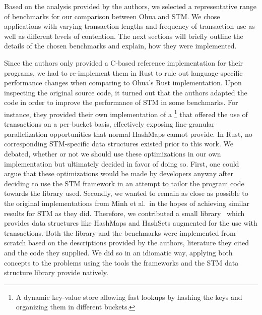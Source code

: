 Based on the analysis provided by the authors, we selected a representative range of benchmarks for our comparison between Ohua and STM.
We chose applications with varying transaction lengths and frequency of transaction use as well as different levels of contention.
The next sections will briefly outline the details of the chosen benchmarks and explain, how they were implemented.


Since the authors only provided a C-based reference implementation for their programs, we had to re-implement them in Rust to rule out language-specific performance changes when comparing to Ohua's Rust implementation.
Upon inspecting the original source code, it turned out that the authors adapted the code in order to improve the performance of STM in some benchmarks.
For instance, they provided their own implementation of a \footnote{A dynamic key-value store allowing fast lookups by hashing the keys and organizing them in different buckets.} that offered the use of transactions on a per-bucket basis, effectively exposing fine-granular parallelization opportunities that normal HashMaps cannot provide.
In Rust, no corresponding STM-specific data structures existed prior to this work.
We debated, whether or not we should use these optimizations in our own implementation but ultimately decided in favor of doing so.
First, one could argue that these optimizations would be made by developers anyway after deciding to use the STM framework in an attempt to tailor the program code towards the library used.
Secondly, we wanted to remain as close as possible to the original implementations from Minh et al.\ in the hopes of achieving similar results for STM as they did.
Therefore, we contributed a small library~\cite{wittwer2020stmdata} which provides data structures like HashMaps and HashSets augmented for the use with transactions.
Both the library and the benchmarks were implemented from scratch based on the descriptions provided by the authors, literature they cited and the code they supplied.
We did so in an idiomatic way, applying both concepts to the problems using the tools the frameworks and the STM data structure library provide natively.



